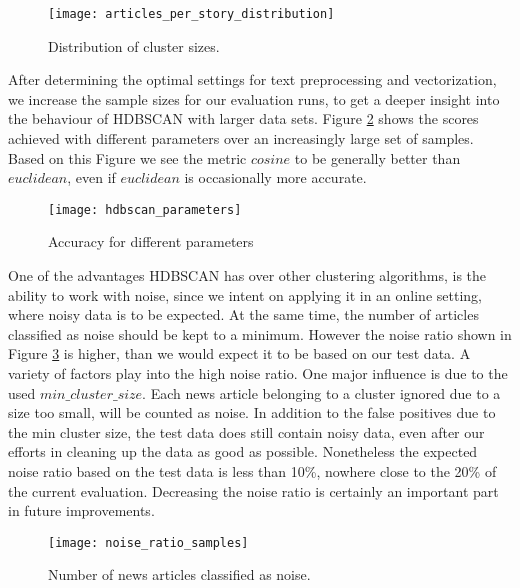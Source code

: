 \begin{figure}[h]
    \centering
    \texttt{[image: articles\_per\_story\_distribution]}
    \caption{Distribution of cluster sizes.}
    \label{fig:articles_per_story_distribution}
\end{figure}

After determining the optimal settings for text preprocessing and vectorization, we increase the sample sizes for our evaluation runs, to get a deeper insight into the behaviour of HDBSCAN with larger data sets. Figure \ref{fig:hdbscan_parameters} shows the scores achieved with different parameters over an increasingly large set of samples. Based on this Figure we see the metric $cosine$ to be generally better than $euclidean$, even if $euclidean$ is occasionally more accurate.


\begin{figure}[h]
    \centering
    \texttt{[image: hdbscan\_parameters]}
    \caption{Accuracy for different parameters}
    \label{fig:hdbscan_parameters}
\end{figure}

One of the advantages HDBSCAN has over other clustering algorithms, is the ability to work with noise, since we intent on applying it in an online setting, where noisy data is to be expected. At the same time, the number of articles classified as noise should be kept to a minimum. However the noise ratio shown in Figure \ref{fig:noise_ratio_samples} is higher, than we would expect it to be based on our test data. A variety of factors play into the high noise ratio. One major influence is due to the used $min\_cluster\_size$. Each news article belonging to a cluster ignored due to a size too small, will be counted as noise. In addition to the false positives due to the min cluster size, the test data does still contain noisy data, even after our efforts in cleaning up the data as good as possible. Nonetheless the expected noise ratio based on the test data is less than 10\%, nowhere close to the 20\% of the current evaluation. Decreasing the noise ratio is certainly an important part in future improvements.



\begin{figure}[h]
    \centering
    \texttt{[image: noise\_ratio\_samples]}
    \caption{Number of news articles classified as noise.}
    \label{fig:noise_ratio_samples}
\end{figure}


